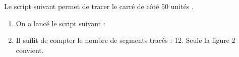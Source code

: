 \documentclass[10pt]{article}
\begin{document}
\medskip


Le script suivant permet de tracer le carré de côté $50$ unités .

\begin{center}
\begin{scratch}
{
}
\end{scratch}
\end{center}

\medskip

\begin{enumerate}
\item %

\medskip

On a lancé le script suivant :

\begin{center}
\begin{scratch}
{
}
\end{scratch}
\end{center}
\item %
Il suffit de compter le nombre de segments tracés : 12. Seule la figure 2 convient.
\end{enumerate}
\end{document}
